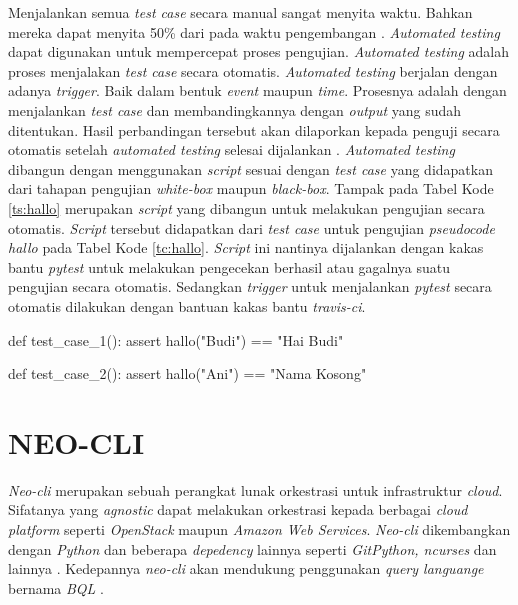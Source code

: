 Menjalankan semua \emph{test case} secara manual sangat menyita
waktu. Bahkan mereka dapat menyita 50\% dari pada waktu pengembangan
\parencite{brooks1995mythical}. \emph{Automated testing} dapat
digunakan untuk mempercepat proses pengujian. \emph{Automated testing}
adalah proses menjalakan \emph{test case} secara otomatis.
\emph{Automated testing} berjalan dengan adanya \emph{trigger}. Baik
dalam bentuk \emph{event} maupun \emph{time}. Prosesnya adalah dengan
menjalankan \emph{test case} dan membandingkannya dengan \emph{output}
yang sudah ditentukan. Hasil perbandingan tersebut akan dilaporkan
kepada penguji secara otomatis setelah \emph{automated testing}
selesai dijalankan \parencite{marcellintravis}. \emph{Automated
  testing} dibangun dengan menggunakan \emph{script} sesuai dengan
\emph{test case} yang didapatkan dari tahapan pengujian
\emph{white-box} maupun \emph{black-box}. Tampak pada Tabel Kode
\ref{ts:hallo} merupakan \emph{script} yang dibangun untuk melakukan
pengujian secara otomatis. \emph{Script} tersebut didapatkan dari
\emph{test case} untuk pengujian \emph{pseudocode hallo} pada Tabel
Kode \ref{tc:hallo}. \emph{Script} ini nantinya dijalankan dengan
kakas bantu \emph{pytest} untuk melakukan pengecekan berhasil atau
gagalnya suatu pengujian secara otomatis. Sedangkan \emph{trigger} untuk
menjalankan \emph{pytest} secara otomatis dilakukan dengan bantuan
kakas bantu \emph{travis-ci}.

\begin{center}
\begin{minipage}{0.8\textwidth}
\begin{code}
\begin{ignasicblock}[title=test\_hallo,minted language=Python]
      def test_case_1():
          assert hallo("Budi") == "Hai Budi"

      def test_case_2():
          assert hallo("Ani") == "Nama Kosong"
\end{ignasicblock}
\label{ts:hallo}
\end{code}
\end{minipage}
\end{center}


\section{NEO-CLI}

\emph{Neo-cli} merupakan sebuah perangkat lunak orkestrasi untuk
infrastruktur \emph{cloud}. Sifatanya yang \emph{agnostic} dapat
melakukan orkestrasi kepada berbagai \emph{cloud platform} seperti
\emph{OpenStack} maupun \emph{Amazon Web Services}. \emph{Neo-cli}
dikembangkan dengan \emph{Python} dan beberapa \emph{depedency}
lainnya seperti \emph{GitPython, ncurses} dan lainnya
\parencite{neo-cli-ol}. Kedepannya \emph{neo-cli} akan mendukung
penggunakan \emph{query languange} bernama \emph{BQL}
\parencite{irawanbiznet}.

